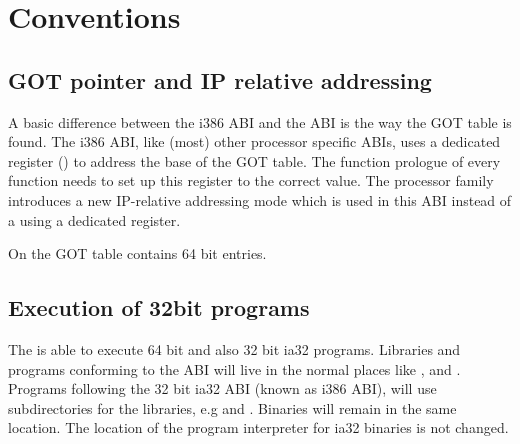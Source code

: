 
\chapter{Conventions}



\section{GOT pointer and IP relative addressing}

A basic difference between the i386 ABI and the \xARCH ABI is the
way the GOT table is found.  The i386 ABI, like (most) other processor
specific ABIs, uses a dedicated register () to address the
base of the GOT table.  The function prologue of every function needs
to set up this register to the correct value.  The \xARCH processor
family introduces a new IP-relative addressing mode which is used in
this ABI instead of a using a dedicated register.

On \xARCH the GOT table contains 64 bit entries.

\section{Execution of 32bit programs}


The \xARCH is able to execute 64 bit \xARCH and also 32 bit ia32
programs.  Libraries and programs conforming to the \xARCH ABI will
live in the normal places like ,  and
.  Programs following the 32 bit ia32 ABI (known as
i386 ABI), will use  subdirectories for the libraries, e.g
 and .  Binaries will remain in
the same location.  The location of the program interpreter for ia32
binaries is not changed.


